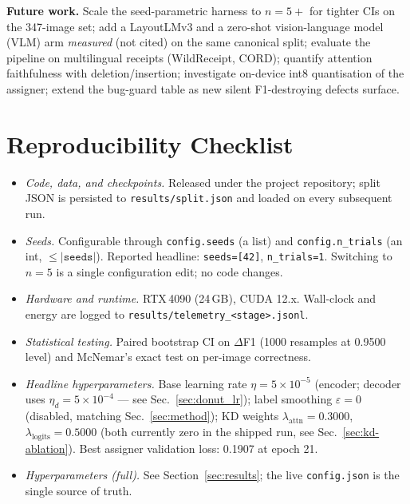 \documentclass[conference]{IEEEtran}
\begin{document}
\textbf{Future work.}
Scale the seed-parametric harness to $n{=}5{+}$ for tighter CIs on
the 347-image set; add a LayoutLMv3 and a zero-shot
vision-language model (VLM) arm
\emph{measured} (not cited) on the same canonical split;
evaluate the pipeline on multilingual receipts (WildReceipt, CORD);
quantify attention faithfulness with deletion/insertion; investigate
on-device int8 quantisation of the assigner; extend the bug-guard
table as new silent F1-destroying defects surface.

\appendices

\section{Reproducibility Checklist}
\label{app:repro}

\begin{itemize}
  \item \emph{Code, data, and checkpoints.}  Released under the
        project repository; split JSON is persisted to
        \texttt{results/split.json} and loaded on every subsequent run.
  \item \emph{Seeds.}  Configurable through \texttt{config.seeds} (a
        list) and \texttt{config.n\_trials} (an int,
        $\le|\texttt{seeds}|$).  Reported headline:
        \texttt{seeds=[42]},
        \texttt{n\_trials=1}.  Switching to $n{=}5$ is a
        single configuration edit; no code changes.
  \item \emph{Hardware and runtime.}  RTX\,4090 (24\,GB), CUDA 12.x.
        Wall-clock and energy are logged to
        \texttt{results/telemetry\_\textless stage\textgreater.jsonl}.
  \item \emph{Statistical testing.}  Paired bootstrap CI on
        $\Delta$F1 (1000 resamples at
        0.9500 level) and McNemar's exact test on
        per-image correctness.
  \item \emph{Headline hyperparameters.}  Base learning rate
        $\eta=\ensuremath{5\times 10^{-5}}$ (encoder; decoder uses $\eta_d=\ensuremath{5\times 10^{-4}}$
        --- see Sec.~\ref{sec:donut_lr}); label smoothing
        $\varepsilon=0$ (disabled, matching Sec.~\ref{sec:method});
        KD weights
        $\lambda_\text{attn}=0.3000$,
        $\lambda_\text{logits}=0.5000$ (both currently
        zero in the shipped run, see
        Sec.~\ref{sec:kd-ablation}).  Best assigner validation loss:
        0.1907 at epoch
        21.
  \item \emph{Hyperparameters (full).}  See Section~\ref{sec:results};
        the live \texttt{config.json} is the single source of truth.
\end{itemize}
\end{document}
